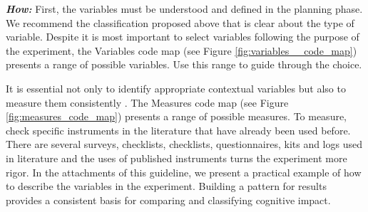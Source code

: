 	\begin{figure}[h] 

   	    \captionsetup{width=10cm}%
	\end{figure}
\vspace{5mm}

\noindent \textit{\textbf{How:}} First, the variables must be understood and defined in the planning phase. We recommend the classification proposed above that is clear about the type of variable. Despite it is most important to select variables following the purpose of the experiment, the Variables code map (see Figure \ref{fig:variables__code_map}) presents a range of possible variables. Use this range to guide through the choice.

It is essential not only to identify appropriate contextual variables but also to measure them consistently \cite{Kitchenham2002PreliminaryEngineering}. The Measures code map (see Figure \ref{fig:measures_code_map}) presents a range of possible measures. To measure, check specific instruments in the literature that have already been used before. There are several surveys, checklists, checklists, questionnaires, kits and logs used in literature and the uses of published instruments turns the experiment more rigor. In the attachments of this guideline, we present a practical example of how to describe the variables in the experiment. Building a pattern for results provides a consistent basis for comparing and classifying cognitive impact.
\vspace{5mm}

